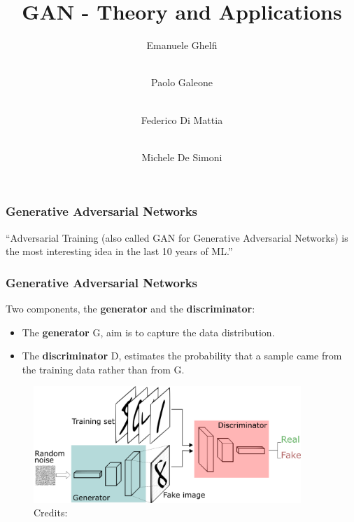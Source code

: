 \documentclass{beamer}
\title[GAN]
{GAN - Theory and Applications}
\author
{Emanuele Ghelfi  \and \\ Paolo Galeone \and \\ Federico Di Mattia \and \\ Michele De Simoni}
\begin{document}
 
{
  \begin{frame}
    \titlepage
  \end{frame}
}

 
\begin{frame}
	\frametitle{Generative Adversarial Networks}
	
	\begin{block}{}
		{\large ``Adversarial Training (also called GAN for Generative Adversarial Networks) is the most interesting idea in the last 10 years of ML.''}
		\vskip5mm
		\hspace*{}
	\end{block}

\end{frame}

\begin{frame}
	\frametitle{Generative Adversarial Networks}
	
	Two components, the \textbf{generator} and the \textbf{discriminator}:
	\begin{itemize}
			\item The \textbf{generator} G, aim is to capture the data distribution.
			\item The \textbf{discriminator} D, estimates the probability that a sample came from the training data rather than from G.
	\end{itemize}
	
	\begin{figure}
		\includegraphics[width=0.9\textwidth]{images/GANs.png}
		\caption{Credits: \cite{silvaIntuitiveIntroductionGenerative2018} }
	\end{figure}

\end{frame}
\end{document}
